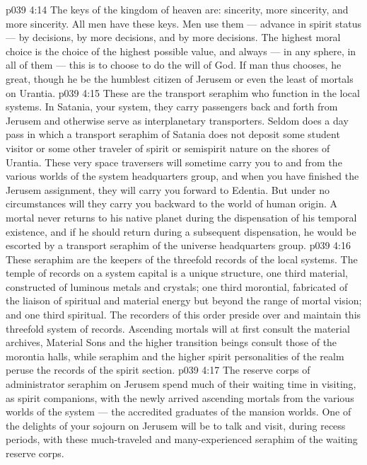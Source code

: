 \vs p039 4:14 The keys of the kingdom of heaven are: sincerity, more sincerity, and more sincerity. All men have these keys. Men use them --- advance in spirit status --- by decisions, by more decisions, and by more decisions. The highest moral choice is the choice of the highest possible value, and always --- in any sphere, in all of them --- this is to choose to do the will of God. If man thus chooses, he  great, though he be the humblest citizen of Jerusem or even the least of mortals on Urantia.
\vs p039 4:15 \pc {}\bibnobreakspace {} These are the transport seraphim who function in the local systems. In Satania, your system, they carry passengers back and forth from Jerusem and otherwise serve as interplanetary transporters. Seldom does a day pass in which a transport seraphim of Satania does not deposit some student visitor or some other traveler of spirit or semispirit nature on the shores of Urantia. These very space traversers will sometime carry you to and from the various worlds of the system headquarters group, and when you have finished the Jerusem assignment, they will carry you forward to Edentia. But under no circumstances will they carry you backward to the world of human origin. A mortal never returns to his native planet during the dispensation of his temporal existence, and if he should return during a subsequent dispensation, he would be escorted by a transport seraphim of the universe headquarters group.
\vs p039 4:16 \pc {}\bibnobreakspace {} These seraphim are the keepers of the threefold records of the local systems. The temple of records on a system capital is a unique structure, one third material, constructed of luminous metals and crystals; one third morontial, fabricated of the liaison of spiritual and material energy but beyond the range of mortal vision; and one third spiritual. The recorders of this order preside over and maintain this threefold system of records. Ascending mortals will at first consult the material archives, Material Sons and the higher transition beings consult those of the morontia halls, while seraphim and the higher spirit personalities of the realm peruse the records of the spirit section.
\vs p039 4:17 \pc {}\bibnobreakspace {} The reserve corps of administrator seraphim on Jerusem spend much of their waiting time in visiting, as spirit companions, with the newly arrived ascending mortals from the various worlds of the system --- the accredited graduates of the mansion worlds. One of the delights of your sojourn on Jerusem will be to talk and visit, during recess periods, with these much\hyp{}traveled and many\hyp{}experienced seraphim of the waiting reserve corps.
